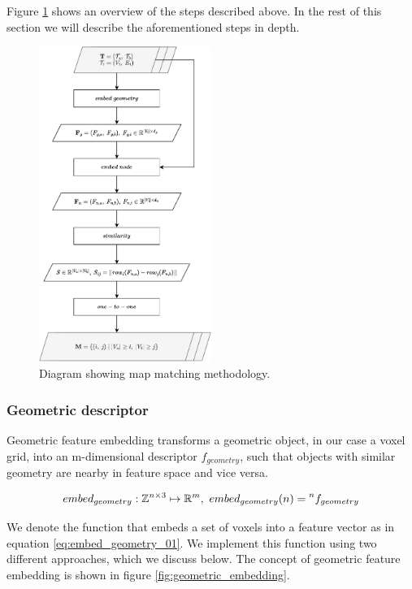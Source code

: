 Figure \ref{fig:flowchart_match} shows an overview of the steps described above. In the rest of this section we will describe the aforementioned steps in depth.

\begin{figure}[h]
    \centering
    \includegraphics*[width=0.5\textwidth]{./fig/flowchart_match.pdf}
    \caption{Diagram showing map matching methodology.}
    \label{fig:flowchart_match}
\end{figure}


\subsubsection{Geometric descriptor}
Geometric feature embedding transforms a geometric object, in our case a voxel grid, into an m-dimensional descriptor \(f_{geometry}\), such that objects with similar geometry are nearby in feature space and vice versa.

\begin{equation}
    \label{eq:embed_geometry_01}
    embed_{geometry}: \voxelset \mapsto \mathbb{R}^m,\ embed_{geometry}(n) = \prescript{n}{}{f_{geometry}}
\end{equation}

We denote the function that embeds a set of voxels into a feature vector as in equation \ref{eq:embed_geometry_01}. We implement this function using two different approaches, which we discuss below. The concept of geometric feature embedding is shown in figure \ref{fig:geometric_embedding}.

